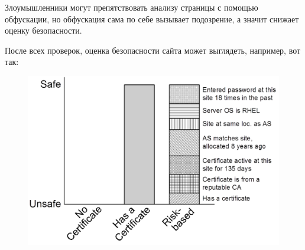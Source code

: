\documentclass[10pt, a5paper]{article}
\begin{document}
Злоумышленники могут препятствовать анализу страницы с помощью
обфускации, но обфускация сама по себе вызывает подозрение, а значит
снижает оценку безопасности.

После всех проверок, оценка безопасности сайта может выглядеть,
например, вот так:

\begin{center}

\begin{figure}[h!]
  \centering
  \includegraphics[width=12cm]{Hlebnikov7.png}
  
  \label{Hlebnikov7}
\end{figure}

\end{center}
\end{document}
